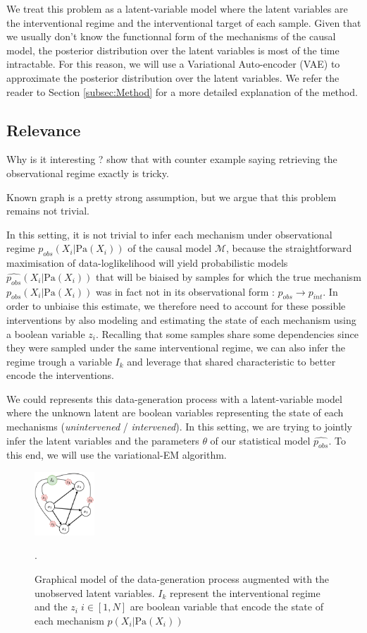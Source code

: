 \documentclass{article}
\begin{document}
We treat this problem as a latent-variable model where the latent variables are the interventional regime and the interventional target of each sample. Given that we usually don't know the functionnal form of the mechanisms of the causal model, the posterior distribution over the latent variables is most of the time intractable. For this reason, we will use a Variational Auto-encoder (VAE) to approximate the posterior distribution over the latent variables. We refer the reader to Section \ref{subsec:Method} for a more detailed explanation of the method.

\subsection{Relevance}
Why is it interesting ? show that with counter example saying retrieving the observational regime exactly is tricky.

Known graph is a pretty strong assumption, but we argue that this problem remains not trivial.

In this setting, it is not trivial to infer each mechanism under observational regime $p_{obs}(X_i | \text{Pa}(X_i))$ of the causal model $\mathcal{M}$, because the straightforward maximisation of data-loglikelihood will yield probabilistic models $\hat{p_{obs}}(X_i | \text{Pa}(X_i))$ that will be biaised by samples for which the true mechanism $p_{obs}(X_i | \text{Pa}(X_i))$ was in fact not in its observational form : $p_{obs} \rightarrow p_{int}$. In order to unbiaise this estimate, we therefore need to account for these possible interventions by also modeling and estimating the state of each mechanism using a boolean variable $z_i$. Recalling that some samples share some dependencies since they were sampled under the same interventional regime, we can also infer the regime trough a variable $I_k$ and  leverage that shared characteristic to better encode the interventions.

We could represents this data-generation process with a latent-variable model where the unknown latent are boolean variables representing the state of each mechanisms (\textit{unintervened} / \textit{intervened}). In this setting, we are trying to jointly infer the latent variables and the parameters $\theta$ of our statistical model $\hat{p_{obs}}$. To this end, we will use the variational-EM algorithm.

\begin{figure}
\centering
    \includegraphics[width=0.2\textwidth]{images/DAG.pdf}
    \caption{Graphical model of the data-generation process augmented with the unobserved latent variables. $I_k$ represent the interventional regime and the $z_i \; i \in [1,N]$ are boolean variable that encode the state of each mechanism $p(X_i | \text{Pa}(X_i))$}.
    \label{fig:DAG}
\end{figure}
\end{document}

